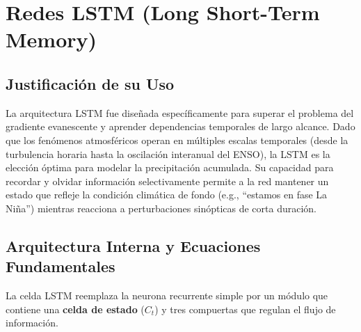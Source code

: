 \documentclass[titlepage,11pt]{report}
\begin{document}
\section{Redes LSTM (Long Short-Term Memory)}

\subsection{Justificación de su Uso}
La arquitectura LSTM fue diseñada específicamente para superar el problema del gradiente evanescente y aprender dependencias temporales de largo alcance. Dado que los fenómenos atmosféricos operan en múltiples escalas temporales (desde la turbulencia horaria hasta la oscilación interanual del ENSO), la LSTM es la elección óptima para modelar la precipitación acumulada. Su capacidad para recordar y olvidar información selectivamente permite a la red mantener un estado que refleje la condición climática de fondo (e.g., ``estamos en fase La Niña'') mientras reacciona a perturbaciones sinópticas de corta duración.

\subsection{Arquitectura Interna y Ecuaciones Fundamentales}
La celda LSTM reemplaza la neurona recurrente simple por un módulo que contiene una \textbf{celda de estado} (\(C_t\)) y tres compuertas que regulan el flujo de información.
\end{document}
